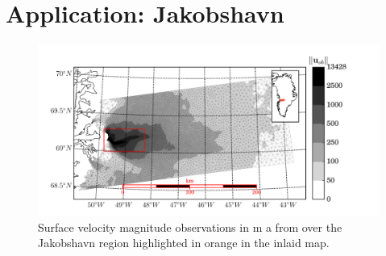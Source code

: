 
\chapter{Application: Jakobshavn} \label{ssn_application_jakobshavn}

\begin{figure}
  \centering
    \includegraphics[width=\linewidth]{images/internal_energy/jakob_results/inversion_Wc_0.01/region.pdf}
  \caption[Jakobshavn Glacier mesh]{Surface velocity magnitude observations in m a from \citet{rignot_2012} over the Jakobshavn region highlighted in {\color[RGB]{245, 81, 58}orange} in the inlaid map.}
  \label{jakobshavn_region}
\end{figure}

